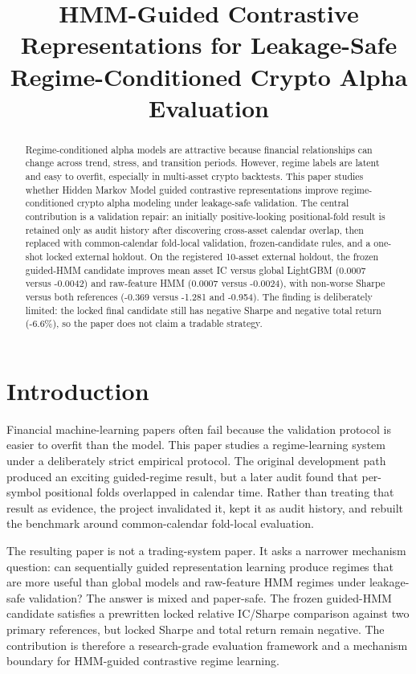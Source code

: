 \documentclass[sigconf,anonymous,review]{acmart}
\title{HMM-Guided Contrastive Representations for Leakage-Safe Regime-Conditioned Crypto Alpha Evaluation}
\begin{document}
\begin{abstract}
Regime-conditioned alpha models are attractive because financial relationships can change across trend, stress, and transition periods. However, regime labels are latent and easy to overfit, especially in multi-asset crypto backtests. This paper studies whether Hidden Markov Model guided contrastive representations improve regime-conditioned crypto alpha modeling under leakage-safe validation. The central contribution is a validation repair: an initially positive-looking positional-fold result is retained only as audit history after discovering cross-asset calendar overlap, then replaced with common-calendar fold-local validation, frozen-candidate rules, and a one-shot locked external holdout. On the registered 10-asset external holdout, the frozen guided-HMM candidate improves mean asset IC versus global LightGBM (0.0007 versus -0.0042) and raw-feature HMM (0.0007 versus -0.0024), with non-worse Sharpe versus both references (-0.369 versus -1.281 and -0.954). The finding is deliberately limited: the locked final candidate still has negative Sharpe and negative total return (-6.6\%), so the paper does not claim a tradable strategy.
\end{abstract}


\maketitle

\section{Introduction}
Financial machine-learning papers often fail because the validation protocol is easier to overfit than the model. This paper studies a regime-learning system under a deliberately strict empirical protocol. The original development path produced an exciting guided-regime result, but a later audit found that per-symbol positional folds overlapped in calendar time. Rather than treating that result as evidence, the project invalidated it, kept it as audit history, and rebuilt the benchmark around common-calendar fold-local evaluation.

The resulting paper is not a trading-system paper. It asks a narrower mechanism question: can sequentially guided representation learning produce regimes that are more useful than global models and raw-feature HMM regimes under leakage-safe validation? The answer is mixed and paper-safe. The frozen guided-HMM candidate satisfies a prewritten locked relative IC/Sharpe comparison against two primary references, but locked Sharpe and total return remain negative. The contribution is therefore a research-grade evaluation framework and a mechanism boundary for HMM-guided contrastive regime learning.
\end{document}
